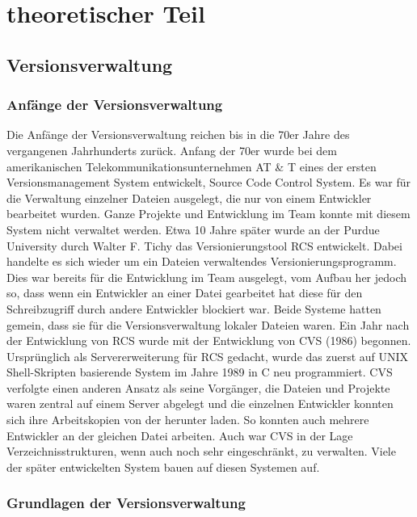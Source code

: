 \chapter{theoretischer Teil}
\section{Versionsverwaltung}
\subsection{Anfänge der Versionsverwaltung}
Die Anfänge der Versionsverwaltung reichen bis in die 70er Jahre des vergangenen Jahrhunderts zurück. Anfang der 70er wurde bei dem amerikanischen Telekommunikationsunternehmen AT \& T eines der ersten Versionsmanagement System entwickelt, Source Code Control System. Es war für die Verwaltung einzelner Dateien ausgelegt, die nur von einem Entwickler bearbeitet wurden. Ganze Projekte und Entwicklung im Team konnte mit diesem System nicht verwaltet werden. 
Etwa 10 Jahre später wurde an der Purdue University durch Walter F. Tichy das Versionierungstool RCS entwickelt. Dabei handelte es sich wieder um ein Dateien verwaltendes Versionierungsprogramm. Dies war bereits für die Entwicklung im Team ausgelegt, vom Aufbau her jedoch so, dass wenn ein Entwickler an einer Datei gearbeitet hat diese für den Schreibzugriff durch andere Entwickler blockiert war. Beide Systeme hatten gemein, dass sie für die Versionsverwaltung lokaler Dateien waren.
Ein Jahr nach der Entwicklung von RCS wurde mit der Entwicklung von CVS (1986) begonnen. Ursprünglich als Servererweiterung für RCS gedacht, wurde das zuerst auf UNIX Shell-Skripten basierende System im Jahre 1989 in C neu programmiert. CVS verfolgte einen anderen Ansatz als seine Vorgänger, die Dateien und Projekte waren zentral auf einem Server abgelegt und die einzelnen Entwickler konnten sich ihre Arbeitskopien von der herunter laden. So konnten auch mehrere Entwickler an der gleichen Datei arbeiten. Auch war CVS in der Lage Verzeichnisstrukturen, wenn auch noch sehr eingeschränkt, zu verwalten. 
Viele der später entwickelten System bauen auf diesen Systemen auf.





\subsection{Grundlagen der Versionsverwaltung}


